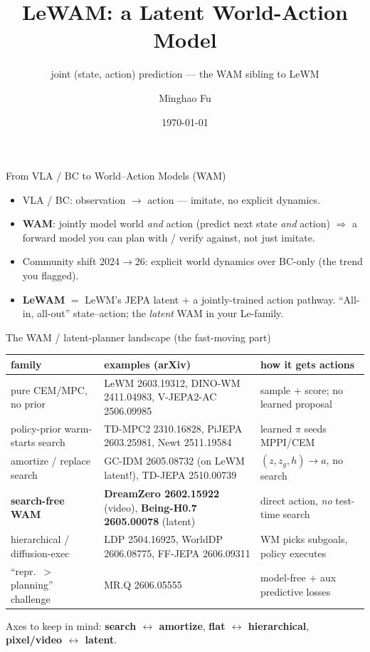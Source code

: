 \documentclass[aspectratio=169,9pt]{beamer}
\title[LeWAM]{LeWAM: a Latent World-Action Model}
\subtitle{joint (state, action) prediction --- the WAM sibling to LeWM}
\author{Minghao Fu}
\institute{\small notes for discussion with R.\ Balestriero}
\date{\today}
\begin{document}
\frame{\titlepage}

\begin{frame}{From VLA / BC to World--Action Models (WAM)}
\begin{itemize}
  \item VLA / BC: observation $\to$ action --- imitate, no explicit dynamics.
  \item \textbf{WAM}: jointly model world \emph{and} action (predict next state \emph{and} action) $\Rightarrow$ a forward model you can plan with / verify against, not just imitate.
  \item Community shift 2024$\to$26: explicit world dynamics over BC-only (the trend you flagged).
  \item \textbf{LeWAM} $=$ LeWM's JEPA latent $+$ a jointly-trained action pathway. ``All-in, all-out'' state--action; the \emph{latent} WAM in your Le-family.
\end{itemize}
\end{frame}

\begin{frame}{The WAM / latent-planner landscape (the fast-moving part)}
\scriptsize
\setlength{\tabcolsep}{3pt}
\begin{tabular}{@{}lll@{}}
\toprule
family & examples (arXiv) & how it gets actions \\
\midrule
pure CEM/MPC, no prior & LeWM 2603.19312, DINO-WM 2411.04983, V-JEPA2-AC 2506.09985 & sample + score; no learned proposal \\
policy-prior warm-starts search & TD-MPC2 2310.16828, PiJEPA 2603.25981, Newt 2511.19584 & learned $\pi$ seeds MPPI/CEM \\
amortize / replace search & GC-IDM 2605.08732 (on LeWM latent!), TD-JEPA 2510.00739 & $(z,z_g,h)\to a$, no search \\
\textbf{search-free WAM} & \textbf{DreamZero 2602.15922} (video), \textbf{Being-H0.7 2605.00078} (latent) & direct action, \emph{no} test-time search \\
hierarchical / diffusion-exec & LDP 2504.16925, WorldDP 2606.08775, FF-JEPA 2606.09311 & WM picks subgoals, policy executes \\
``repr.\ $>$ planning'' challenge & MR.Q 2606.05555 & model-free + aux predictive losses \\
\bottomrule
\end{tabular}
\vspace{0.4em}
\par\footnotesize Axes to keep in mind: \textbf{search $\leftrightarrow$ amortize}, \textbf{flat $\leftrightarrow$ hierarchical}, \textbf{pixel/video $\leftrightarrow$ latent}.
\end{frame}
\end{document}

